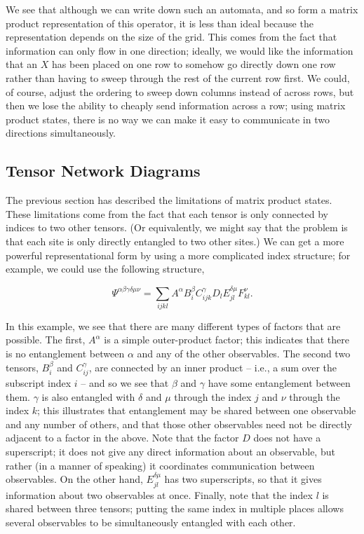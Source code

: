 \documentclass[12pt]{amsbook}
\theoremstyle{plain}
\theoremstyle{definition}
\theoremstyle{remark}
\newcommand{\eqn}[2][]{\begin{equation}\label{#1}#2\end{equation}}
\begin{document}
We see that although we can write down such an automata, and so form a matrix product representation of this operator, it is less than ideal because the representation depends on the size of the grid.  This comes from the fact that information can only flow in one direction;  ideally, we would like the information that an $X$ has been placed on one row to somehow go directly down one row rather than having to sweep through the rest of the current row first.  We could, of course, adjust the ordering to sweep down columns instead of across rows, but then we lose the ability to cheaply send information across a row;  using matrix product states, there is no way we can make it easy to communicate in two directions simultaneously.
\subsection{Tensor Network Diagrams}

\label{tensordiagram}

The previous section has described the limitations of matrix product states.  These limitations come from the fact that each tensor is only connected by indices to two other tensors.  (Or equivalently, we might say that the problem is that each site is only directly entangled to two other sites.)  We can get a more powerful representational form by using a more complicated index structure; for example, we could use the following structure,

\eqn[crazy-tensor-product]{\Psi^{\alpha\beta\gamma\delta\mu\nu} =
  \sum_{ijkl} A^\alpha B^{\beta}_{i} C^{\gamma}_{ijk} D_{l} E_{jl}^{\delta\mu} F_{kl}^{\nu}.}

In this example, we see that there are many different types of factors that are possible.  The first, $A^\alpha$ is a simple outer-product factor;  this indicates that there is no entanglement between $\alpha$ and any of the other observables.  The second two tensors, $B^\beta_i$ and $C^\gamma_{ij}$, are connected by an inner product -- i.e., a sum over the subscript index $i$ -- and so we see that $\beta$ and $\gamma$ have some entanglement between them.  $\gamma$ is also entangled with $\delta$ and $\mu$ through the index $j$ and $\nu$ through the index $k$;  this illustrates that entanglement may be shared between one observable and any number of others, and that those other observables need not be directly adjacent to a factor in the above.  Note that the factor $D$ does not have a superscript;  it does not give any direct information about an observable, but rather (in a manner of speaking) it coordinates communication between observables.  On the other hand, $E_{jl}^{\delta\mu}$ has two superscripts, so that it gives information about two observables at once.  Finally, note that the index $l$ is shared between three tensors;  putting the same index in multiple places allows several observables to be simultaneously entangled with each other.
\end{document}
